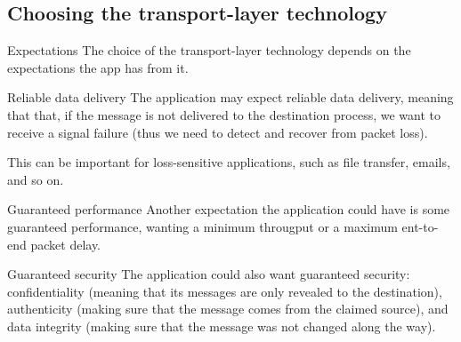 \documentclass[a4paper]{article}
\begin{document}
\subsection{Choosing the transport-layer technology}
\begin{parag}{Expectations}
    The choice of the transport-layer technology depends on the expectations the app has from it.

    \begin{subparag}{Reliable data delivery}
        The application may expect reliable data delivery, meaning that that, if the message is not delivered to the destination process, we want to receive a signal failure (thus we need to detect and recover from packet loss).

        This can be important for loss-sensitive applications, such as file transfer, emails, and so on.
    \end{subparag}

    \begin{subparag}{Guaranteed performance}
        Another expectation the application could have is some guaranteed performance, wanting a minimum througput or a maximum ent-to-end packet delay.
    \end{subparag}

    \begin{subparag}{Guaranteed security}
        The application could also want guaranteed security: confidentiality (meaning that its messages are only revealed to the destination), authenticity (making sure that the message comes from the claimed source), and data integrity (making sure that the message was not changed along the way).
    \end{subparag}
    
\end{parag}
\end{document}
